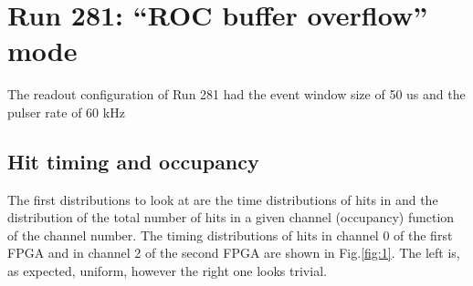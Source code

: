 \section{Run 281: ``ROC buffer overflow'' mode}
The readout configuration of Run 281 had the event window size of 50 us
and the pulser rate of 60 kHz

\subsection{Hit timing and occupancy}\label{over}
The first distributions to look at are the time distributions of hits in 
 and the  distribution of the total number of hits
in a given channel (occupancy)  function of the channel number.
The timing distributions of hits  in channel 0 of the first FPGA
and in channel 2 of the second FPGA are shown in Fig.\ref{fig:1}.
The left  is, as expected, uniform, however the right one looks
  trivial.

